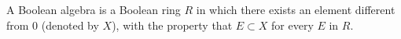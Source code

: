 A Boolean algebra is a Boolean ring $R$ in which there exists an element different from $0$ (denoted by $X$), with the property that $E \subset X$ for every $E$ in $R$.
